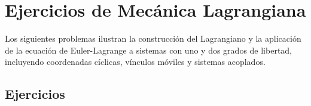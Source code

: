 
\section{Ejercicios de Mecánica Lagrangiana}

Los siguientes problemas ilustran la construcción del Lagrangiano y la
aplicación de la ecuación de Euler-Lagrange a sistemas con uno y dos
grados de libertad, incluyendo coordenadas cíclicas, vínculos móviles
y sistemas acoplados.

\subsection{Ejercicios}


\clearpage

\clearpage

\clearpage

\clearpage

\clearpage

\clearpage

\clearpage

\clearpage

\clearpage

